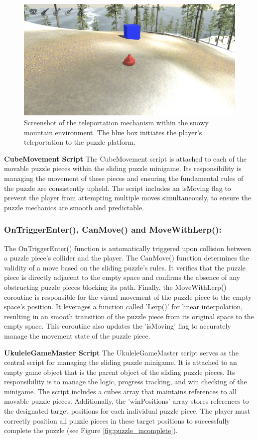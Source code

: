 \documentclass{l4proj}
\begin{document}
\begin{figure}[h]
  \centering
  \includegraphics[width=0.7\linewidth]{dissertation/images/Sliding_Teleport.png} 
  \caption{Screenshot of the teleportation mechanism within the snowy mountain environment. The blue box initiates the player's teleportation to the puzzle platform.} 
  \label{fig:teleportation} 
\end{figure}

\textbf{CubeMovement Script} \newline
The CubeMovement script is attached to each of the movable puzzle pieces within the sliding puzzle minigame. Its responsibility is managing the movement of these pieces and ensuring the fundamental rules of the puzzle are consistently upheld. The script includes an isMoving flag to prevent the player from attempting multiple moves simultaneously, to ensure the puzzle mechanics are smooth and predictable.

\subsubsection{OnTriggerEnter(), CanMove() and MoveWithLerp():} The OnTriggerEnter() function is automatically triggered upon collision between a puzzle piece's collider and the player. The CanMove() function determines the validity of a move based on the sliding puzzle's rules. It verifies that the puzzle piece is directly adjacent to the empty space and confirms the absence of any obstructing puzzle pieces blocking its path. Finally, the MoveWithLerp() coroutine is responsible for the visual movement of the puzzle piece to the empty space's position. It leverages a function called 'Lerp()' for linear interpolation, resulting in an smooth transition of the puzzle piece from its original space to the empty space. This coroutine also updates the 'isMoving' flag to accurately manage the movement state of the puzzle piece.\newline

\textbf{UkuleleGameMaster Script} \newline
The UkuleleGameMaster script serves as the central script for managing the sliding puzzle minigame. It is attached to an empty game object that is the parent object of the sliding puzzle pieces. Its responsibility is to manage the logic, progress tracking, and win checking of the minigame. The script includes a cubes array that maintains references to all movable puzzle pieces. Additionally, the 'winPositions' array stores references to the designated target positions for each individual puzzle piece. The player must correctly position all puzzle pieces in these target positions to successfully complete the puzzle (see Figure \ref{fig:puzzle_incomplete}).
\end{document}

